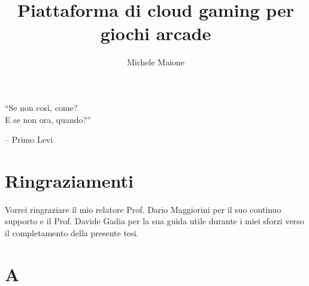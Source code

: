 \documentclass[italian]{book}
\title{Piattaforma di cloud gaming per giochi arcade}
\author{Michele Maione}
\begin{document}
\frontespizio

\frontmatter

{
\raggedleft \large \sl 
	
	
	``Se non così, come?\\E se non ora, quando?''
	
	\bigskip
	
	\--- Primo Levi\\
}



\chapter*{Ringraziamenti}
Vorrei ringraziare il mio relatore Prof. Dario Maggiorini per il suo continuo supporto e il Prof. Davide Gadia per la sua guida utile durante i miei sforzi verso il completamento della presente tesi.

%
%

{\let\cleardoublepage\clearpage\tableofcontents}

\mainmatter













% 
% 

\appendix

\chapter{A}

%
%


\end{document}
